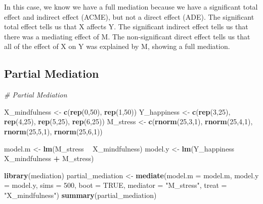 \documentclass[]{book}
\newenvironment{Shaded}{\begin{snugshade}}{\end{snugshade}}
\newcommand{\CommentTok}[1]{\textcolor[rgb]{0.56,0.35,0.01}{\textit{#1}}}
\newcommand{\DataTypeTok}[1]{\textcolor[rgb]{0.13,0.29,0.53}{#1}}
\newcommand{\DecValTok}[1]{\textcolor[rgb]{0.00,0.00,0.81}{#1}}
\newcommand{\KeywordTok}[1]{\textcolor[rgb]{0.13,0.29,0.53}{\textbf{#1}}}
\newcommand{\NormalTok}[1]{#1}
\newcommand{\OperatorTok}[1]{\textcolor[rgb]{0.81,0.36,0.00}{\textbf{#1}}}
\newcommand{\OtherTok}[1]{\textcolor[rgb]{0.56,0.35,0.01}{#1}}
\newcommand{\StringTok}[1]{\textcolor[rgb]{0.31,0.60,0.02}{#1}}
\begin{document}
In this case, we know we have a full mediation because we have a significant total effect and indirect effect (ACME), but not a direct effect (ADE). The significant total effect tells us that X affects Y. The significant indirect effect tells us that there was a mediating effect of M. The non-significant direct effect tells us that all of the effect of X on Y was explained by M, showing a full mediation.

\hypertarget{partial-mediation}{%
\subsection{Partial Mediation}\label{partial-mediation}}

\begin{Shaded}
\begin{Highlighting}[]
\CommentTok{# Partial Mediation}

\NormalTok{X_mindfulness <-}\StringTok{ }\KeywordTok{c}\NormalTok{(}\KeywordTok{rep}\NormalTok{(}\DecValTok{0}\NormalTok{,}\DecValTok{50}\NormalTok{), }\KeywordTok{rep}\NormalTok{(}\DecValTok{1}\NormalTok{,}\DecValTok{50}\NormalTok{))}
\NormalTok{Y_happiness <-}\StringTok{ }\KeywordTok{c}\NormalTok{(}\KeywordTok{rep}\NormalTok{(}\DecValTok{3}\NormalTok{,}\DecValTok{25}\NormalTok{), }\KeywordTok{rep}\NormalTok{(}\DecValTok{4}\NormalTok{,}\DecValTok{25}\NormalTok{), }\KeywordTok{rep}\NormalTok{(}\DecValTok{5}\NormalTok{,}\DecValTok{25}\NormalTok{), }\KeywordTok{rep}\NormalTok{(}\DecValTok{6}\NormalTok{,}\DecValTok{25}\NormalTok{))}
\NormalTok{M_stress  <-}\StringTok{ }\KeywordTok{c}\NormalTok{(}\KeywordTok{rnorm}\NormalTok{(}\DecValTok{25}\NormalTok{,}\DecValTok{3}\NormalTok{,}\DecValTok{1}\NormalTok{), }\KeywordTok{rnorm}\NormalTok{(}\DecValTok{25}\NormalTok{,}\DecValTok{4}\NormalTok{,}\DecValTok{1}\NormalTok{), }\KeywordTok{rnorm}\NormalTok{(}\DecValTok{25}\NormalTok{,}\DecValTok{5}\NormalTok{,}\DecValTok{1}\NormalTok{), }\KeywordTok{rnorm}\NormalTok{(}\DecValTok{25}\NormalTok{,}\DecValTok{6}\NormalTok{,}\DecValTok{1}\NormalTok{))}


\NormalTok{model.m <-}\StringTok{ }\KeywordTok{lm}\NormalTok{(M_stress }\OperatorTok{~}\StringTok{ }\NormalTok{X_mindfulness)}
\NormalTok{model.y <-}\StringTok{ }\KeywordTok{lm}\NormalTok{(Y_happiness }\OperatorTok{~}\StringTok{ }\NormalTok{X_mindfulness }\OperatorTok{+}\StringTok{ }\NormalTok{M_stress)}

\KeywordTok{library}\NormalTok{(mediation)}
\NormalTok{partial_mediation <-}\StringTok{ }\KeywordTok{mediate}\NormalTok{(}\DataTypeTok{model.m =}\NormalTok{ model.m,}
                       \DataTypeTok{model.y =}\NormalTok{ model.y,}
                       \DataTypeTok{sims =} \DecValTok{500}\NormalTok{,}
                       \DataTypeTok{boot =} \OtherTok{TRUE}\NormalTok{,}
                       \DataTypeTok{mediator =} \StringTok{"M_stress"}\NormalTok{,}
                       \DataTypeTok{treat =} \StringTok{"X_mindfulness"}\NormalTok{)}
\KeywordTok{summary}\NormalTok{(partial_mediation)}
\end{Highlighting}
\end{Shaded}
\end{document}

